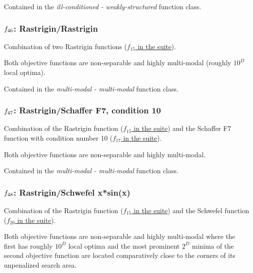 \documentclass[letterpaper,12pt,english]{article}
\begin{document}
Contained in the \emph{ill-conditioned - weakly-structured} function class.


\subsubsection{\protect\(f_{46}\protect\): Rastrigin/Rastrigin}
\label{index:rastrigin-rastrigin}\label{index:f46}
Combination of two Rastrigin functions
(\href{http://coco.lri.fr/downloads/download15.03/bbobdocfunctions.pdf\#page=75}{\(f_{15}\) in the  suite}).

Both objective functions are non-separable and highly multi-modal
(roughly \(10^D\) local optima).

Contained in the \emph{multi-modal - multi-modal} function class.


\subsubsection{\protect\(f_{47}\protect\): Rastrigin/Schaffer F7, condition 10}
\label{index:rastrigin-schaffer-f7-condition-10}\label{index:f47}
Combination of the Rastrigin function
(\href{http://coco.lri.fr/downloads/download15.03/bbobdocfunctions.pdf\#page=75}{\(f_{15}\) in the  suite}) and the Schaffer F7 function with
condition number 10 (\href{http://coco.lri.fr/downloads/download15.03/bbobdocfunctions.pdf\#page=85}{\(f_{17}\) in the  suite}).

Both objective functions are non-separable and highly multi-modal.

Contained in the \emph{multi-modal - multi-modal} function class.


\subsubsection{\protect\(f_{48}\protect\): Rastrigin/Schwefel x*sin(x)}
\label{index:f48}\label{index:rastrigin-schwefel-x-sin-x}
Combination of the Rastrigin function
(\href{http://coco.lri.fr/downloads/download15.03/bbobdocfunctions.pdf\#page=75}{\(f_{15}\) in the  suite}) and the Schwefel function (\href{http://coco.lri.fr/downloads/download15.03/bbobdocfunctions.pdf\#page=100}{\(f_{20}\) in the  suite}).

Both objective functions are non-separable and highly multi-modal where
the first has roughly \(10^D\) local optima and the most prominent
\(2^D\) minima of the second objective function are located
comparatively close to the corners of its unpenalized search area.
\end{document}
